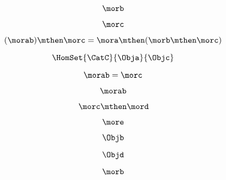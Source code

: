 {\begin{forslides}
        \begin{equation}
            \label{eq:semicats-slides-102}
            \morb
        \end{equation}

        \begin{equation}
            \label{eq:semicats-slides-103}
            \morc
        \end{equation}

        \begin{equation}
            \label{eq:semicats-slides-104}
            (\morab) \mthen \morc = \mora \mthen (\morb \mthen \morc)
        \end{equation}

        \begin{equation}
            \label{eq:semicats-slides-105}
            \HomSet{\CatC}{\Obja}{\Objc}
        \end{equation}

        \begin{equation}
            \label{eq:semicats-slides-106}
            \morab = \morc
        \end{equation}

        \begin{equation}
            \label{eq:semicats-slides-107}
            \morab
        \end{equation}

        \begin{equation}
            \label{eq:semicats-slides-108}
            \morc \mthen \mord
        \end{equation}

        \begin{equation}
            \label{eq:semicats-slides-109}
            \more
        \end{equation}

        \begin{equation}
            \label{eq:semicats-slides-110}
            \Objb
        \end{equation}

        \begin{equation}
            \label{eq:semicats-slides-111}
            \Objd
        \end{equation}

        \begin{equation}
            \label{eq:semicats-slides-112}
            \morb
        \end{equation}


\end{forslides}}
